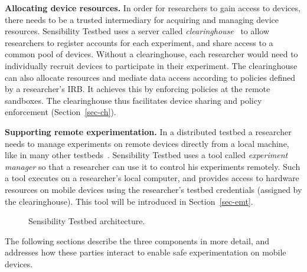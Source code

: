\textbf{Allocating device resources.}
In order for researchers to gain access to devices, there needs to be a 
trusted intermediary for acquiring and managing device resources.
Sensibility Testbed uses a server called \textit{clearinghouse}~\cite{ch} to allow researchers to 
register accounts for each experiment, and share access to a common 
pool of devices. Without a clearinghouse, each researcher would 
need to individually recruit devices to participate in their experiment. 
The clearinghouse can also allocate resources and mediate 
data access according to policies defined by a researcher's IRB. It 
achieves this by enforcing policies at the remote sandboxes. The 
clearinghouse thus facilitates device sharing and policy enforcement 
(Section~\ref{sec-ch}).

\textbf{Supporting remote experimentation.} 
In a distributed testbed a researcher needs to manage experiments 
on remote devices directly from a local machine, like in many other 
testbeds~\cite{hibler2008large, peterson2006experiences}. Sensibility 
Testbed uses a tool called \textit{experiment manager} so that a 
researcher can use it to control his experiments remotely. Such a tool 
executes on a researcher's local computer, and provides access to 
hardware resources on mobile devices using the researcher's testbed 
credentials (assigned by the clearinghouse). This tool will be introduced
in Section~\ref{sec-emt}.

\begin{figure}
\caption{\small Sensibility Testbed architecture. \label{fig-arch}}
\end{figure}


\smallskip
The following sections describe the three components in more detail, and 
addresses how these parties interact to enable safe experimentation on 
mobile devices. 

